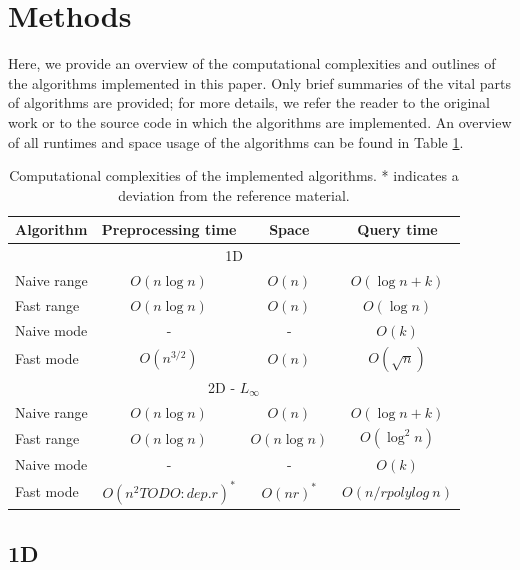 \documentclass{article}
\begin{document}
\section{Methods}
Here, we provide an overview of the computational complexities and outlines of
the algorithms implemented in this paper. Only brief summaries of the vital
parts of algorithms are provided; for more details, we refer the reader to the
original work or to the source code in which the algorithms are implemented. An
overview of all runtimes and space usage of the algorithms can be found in
Table \ref{tab:runtimes}.
\begin{table}[h]
    \centering
    \begin{tabular}{|l|ccc|}
        \hline
        Algorithm   & Preprocessing time & Space         & Query time                   \\
        \hline
        \hline
        \multicolumn{4}{|c|}{1D}                                                        \\
        \hline
        Naive range & $O(n \log n)$      & $O(n)$        & $O(\log n + k)$              \\
        Fast range  & $O(n \log n)$      & $O(n)$        & $O(\log n)$                  \\
        Naive mode  & -                  & -             & $O(k)$                       \\
        Fast mode   & $O(n^{3/2})$       & $O(n)$        & $O(\sqrt{n})$                \\
        \hline
        \multicolumn{4}{|c|}{2D - $L_\infty$}                                           \\
        \hline
        Naive range & $O(n \log n)$      & $O(n)$        & $O(\log n + k)$              \\
        Fast range  & $O(n \log n)$      & $O(n \log n)$ & $O(\log^2 n)$                \\
        Naive mode  & -                  & -             & $O(k)$                       \\
        Fast mode   & $O(n^2 TODO: dep. r)^*$         & $O(nr)^*$     & $O(n/r \textit{polylog}\:n)$ \\
        \hline
    \end{tabular}
    \caption{Computational complexities of the implemented algorithms. * indicates a deviation from the reference material.}
    \label{tab:runtimes}
\end{table}
\subsection{1D}
\end{document}
